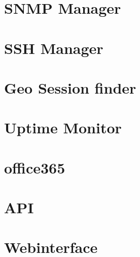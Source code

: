 \documentclass{article}
\begin{document}
	\section{SNMP Manager}
	
	\newpage
	
	\section{SSH Manager}
	
	\newpage
	
	\section{Geo Session finder}
	
	\newpage
	
	\section{Uptime Monitor}
	
	\newpage
	
	\section{office365}
	
	\newpage
	
	\section{API}
	
	\newpage
	
	\section{Webinterface}
	
	\newpage
\end{document}
